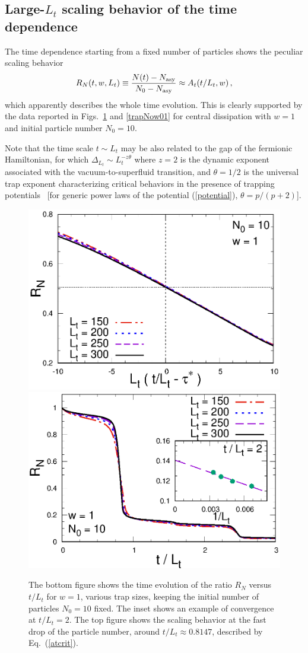   
  \subsection{Large-$L_t$ scaling behavior of the time dependence}
  \label{trapscaling}
  
  
  The time dependence starting from a fixed number of particles shows
  the peculiar scaling behavior
  \begin{equation}
    R_N(t,w,L_t) \equiv {N(t)-N_{\rm asy}\over N_0-N_{\rm asy}} \approx
    A_t(t/L_t,w)\,,
    \label{rntrapn0}
  \end{equation}
  which apparently describes the whole time evolution.  This is clearly
  supported by the data reported in Figs.~\ref{trapNo} and
  \ref{trapNow01} for central dissipation with $w=1$ and initial
  particle number $N_0=10$.
  
  Note that the time scale $t\sim L_t$ may be also related to the gap of
  the fermionic Hamiltonian, for which $\Delta_{L_t} \sim
  L_t^{-z\theta}$ where $z=2$ is the dynamic exponent associated with
  the vacuum-to-superfluid transition, and $\theta=1/2$ is the universal
  trap exponent characterizing critical behaviors in the presence of
  trapping potentials~\cite{CV-09,CV-10,ACV-14,RV-21-rev} [for generic
    power laws of the potential (\ref{potential}), $\theta=p/(p+2)$].
  
  \begin{figure}[!htb]
\centering
  \includegraphics[width=0.65\columnwidth]{imm/crit.eps}
  \includegraphics[width=0.65\columnwidth]{imm/RNtrapNo.eps}
  \caption{ The bottom figure shows the time evolution of the ratio
    $R_N$ versus $t/L_t$ for $w=1$, various trap sizes, keeping the
    initial number of particles $N_0=10$ fixed.  The inset shows an
    example of convergence at $t/L_t=2$.  The top figure shows the
    scaling behavior at the fast drop of the particle number, around
    $t/L_t\approx 0.8147$, described by Eq.~(\ref{atcrit}).  }
  \label{trapNo}
  \end{figure}
  
